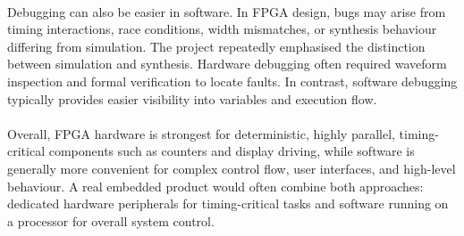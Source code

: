 \documentclass[12pt]{article}
\begin{document}
	\\
	Debugging can also be easier in software. In FPGA design, bugs may arise from timing interactions, race conditions, width mismatches, or synthesis behaviour differing from simulation. The project repeatedly emphasised the distinction between simulation and synthesis. Hardware debugging often required waveform inspection and formal verification to locate faults. In contrast, software debugging typically provides easier visibility into variables and execution flow.\\
	\\
	Overall, FPGA hardware is strongest for deterministic, highly parallel, timing-critical components such as counters and display driving, while software is generally more convenient for complex control flow, user interfaces, and high-level behaviour. A real embedded product would often combine both approaches: dedicated hardware peripherals for timing-critical tasks and software running on a processor for overall system control.\\
	\\
\end{document}

